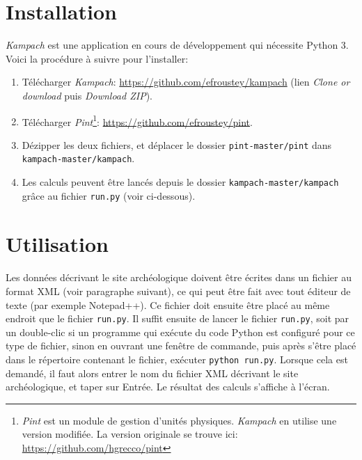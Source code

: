 \documentclass{article}
\begin{document}
\section{Installation}
\textit{Kampach} est une application en cours de développement qui nécessite Python 3. Voici la procédure à suivre pour l'installer:
\begin{enumerate}
 \item Télécharger \textit{Kampach}: \url{https://github.com/efroustey/kampach} (lien \textit{Clone or download} puis \textit{Download ZIP}).
 
 \item Télécharger \textit{Pint}\footnote{\textit{Pint} est un module de gestion d'unités physiques. \textit{Kampach} en utilise une version modifiée. La version originale se trouve ici: \url{https://github.com/hgrecco/pint}}: \url{https://github.com/efroustey/pint}.
 
 \item Dézipper les deux fichiers, et déplacer le dossier \texttt{pint-master/pint} dans \texttt{kampach-master/kampach}.
 
 \item Les calculs peuvent être lancés depuis le dossier \texttt{kampach-master/kampach} grâce au fichier \texttt{run.py} (voir ci-dessous).
\end{enumerate}

\section{Utilisation}

\paragraph{}
Les données décrivant le site archéologique doivent être écrites dans un fichier au format XML (voir paragraphe suivant), ce qui peut être fait avec tout éditeur de texte (par exemple Notepad++). Ce fichier doit ensuite être placé au même endroit que le fichier \texttt{run.py}. Il suffit ensuite de lancer le fichier \texttt{run.py}, soit par un double-clic si un programme qui exécute du code Python est configuré pour ce type de fichier, sinon en ouvrant une fenêtre de commande, puis après s'être placé dans le répertoire contenant le fichier, exécuter \texttt{python run.py}. Lorsque cela est demandé, il faut alors entrer le nom du fichier XML décrivant le site archéologique, et taper sur Entrée. Le résultat des calculs s'affiche à l'écran.
\end{document}
